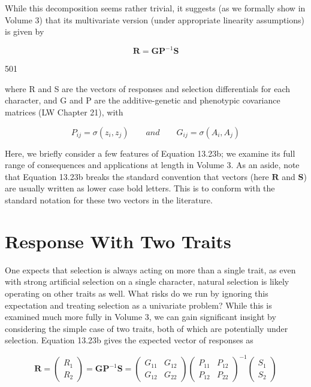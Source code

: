 \documentclass{article}
\begin{document}
While this decomposition seems rather trivial, it suggests (as we formally show in Volume 3) that its multivariate version (under appropriate linearity assumptions) is given by

\begin{equation}
\mathbf{R}=\mathbf{G}\mathbf{P}^{-1}\mathbf{S}
\tag{13.23b}
\label{eq:13_23b}
\end{equation}

501

where R and S are the vectors of responses and selection differentials for each character, and G and P are the additive-genetic and phenotypic covariance matrices (LW Chapter 21), with

\begin{equation}
P_{ij}=\sigma(z_{i},z_{j})\qquad and\qquad G_{ij}=\sigma(A_{i},A_{j})
\tag{13.23c}
\label{eq:13_23c}
\end{equation}

Here, we briefly consider a few features of Equation 13.23b; we examine its full range of consequences and applications at length in Volume 3. As an aside, note that Equation 13.23b breaks the standard convention that vectors (here  $ \mathbf{R} $ and  $ \mathbf{S} $) are usually written as lower case bold letters. This is to conform with the standard notation for these two vectors in the literature.

\section{Response With Two Traits}
One expects that selection is always acting on more than a single trait, as even with strong artificial selection on a single character, natural selection is likely operating on other traits as well. What risks do we run by ignoring this expectation and treating selection as a univariate problem? While this is examined much more fully in Volume 3, we can gain significant insight by considering the simple case of two traits, both of which are potentially under selection. Equation 13.23b gives the expected vector of responses as

\begin{equation}
\mathbf{R}=\begin{pmatrix}R_{1}\\ R_{2}\end{pmatrix}=\mathbf{G}\mathbf{P}^{-1}\mathbf{S}=\begin{pmatrix}G_{11}&G_{12}\\ G_{12}&G_{22}\end{pmatrix}\begin{pmatrix}P_{11}&P_{12}\\ P_{12}&P_{22}\end{pmatrix}^{-1}\begin{pmatrix}S_{1}\\ S_{2}\end{pmatrix}
\tag{13.24a}
\label{eq:13_24a}
\end{equation}
\end{document}
